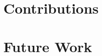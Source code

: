 \label{sec::5_co}

\FloatBarrier
\section{Contributions}
\label{sec::51_co}

\FloatBarrier
\section{Future Work}
\label{sec::51_fw}
\cite{jouppi2017datacenter}

